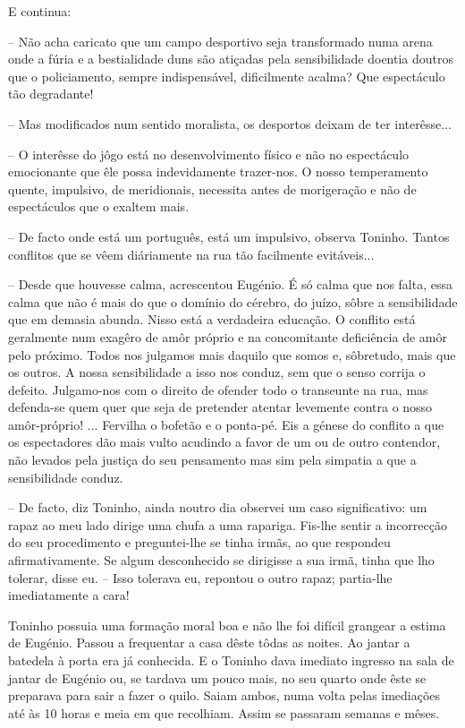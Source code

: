\documentclass[9pt]{article}
\begin{document}
E continua:

-- Não acha caricato que um campo desportivo seja transformado
numa arena onde a fúria e a bestialidade duns são atiçadas pela sensibilidade doentia doutros que o policiamento, sempre indispensável,
dificilmente acalma? Que espectáculo tão degradante!

-- Mas modifi\-cados num sentido moralista, os desportos deixam de
ter interêsse...

-- O interêsse do jôgo está no desenvolvimento físico e não no
espectáculo emocionante que êle possa indevidamente trazer-nos. O nos\-so temperamento quente, impulsivo, de meridionais, necessita antes de
morigera\-ção e não de espectáculos que o exaltem mais.

-- De facto onde está um por\-tu\-guês, está um impulsivo, observa Toninho. Tantos conflitos que se vêem diáriamente na rua tão facilmente
evitáveis...

-- Desde que houvesse calma, acrescentou Eugé\-nio. É só calma que nos
falta, essa calma que não é mais do que o domínio do cérebro, do juízo, sôbre a sensibilidade que em demasia abunda. Nisso está a verdadeira educa\-ção. O conflito está geralmente num exagêro de amôr próprio e
na concomitante deficiência de amôr pelo próximo. Todos nos julgamos
mais daquilo que somos e, sôbretudo, mais que os outros. A nossa sensibilidade a isso nos conduz, sem que o senso corrija o defeito. Julgamo-nos com o direito de ofender todo o transeunte na rua, mas defenda-se
quem quer que seja de pretender atentar levemente contra o nosso amôr-próprio!%
... Fervi\-lha o bofetão e o ponta-pé. Eis a génese do conflito a que
os espectadores dão mais vulto acudindo a favor de um ou de outro contendor, não levados pela justiça do seu pensamento mas sim pela simpatia a que a sensibilidade conduz.

-- De facto, diz Toninho, ainda noutro dia observei um caso signifi\-cativo: um rapaz ao meu lado dirige uma chufa a uma rapariga. Fis-\-lhe
sentir a incorrec\-ção do seu procedimento e preguntei-\-lhe se tinha irmãs, ao que respondeu afirmativamente. Se algum desconhecido se dirigisse a sua irmã, tinha que lho tolerar, disse eu. -- Isso tolerava eu,
repontou o outro rapaz; partia-\-lhe imediatamente a cara!

Toninho possuia uma forma\-ção moral boa e não lhe foi difícil grangear
a estima de Eugé\-nio. Passou a frequentar a casa dêste tôdas as noites. Ao
jantar a batedela à porta era já conhecida. E o Toninho dava imediato ingresso na sala de jantar de Eugé\-nio ou, se tardava um pouco mais, no seu quarto
onde êste se preparava para sair a fazer o quilo. Saiam ambos, numa volta
pelas imedia\-ções até às 10 horas e meia em que reco\-lhiam. Assim se passaram semanas e mêses.
\end{document}
